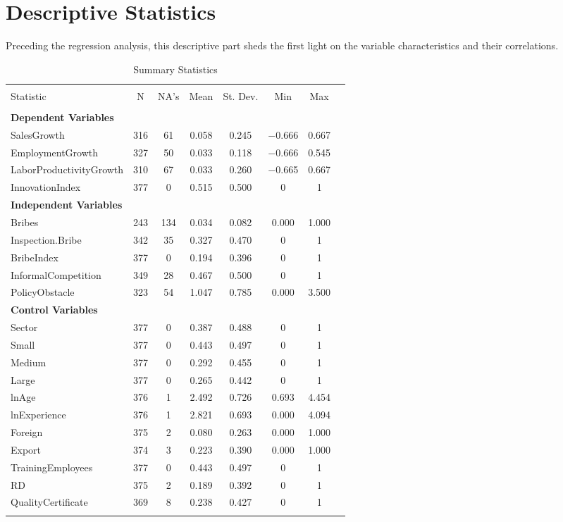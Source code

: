 \section{Descriptive Statistics}
Preceding the regression analysis, this descriptive part sheds the first light on the variable characteristics and their correlations. 
\begin{table}[!htbp] \centering 
  \caption{Summary Statistics} 
  \label{} 
\begin{tabular}{@{\extracolsep{5pt}}lccccccc} 
\\[-1.8ex]\hline 
\hline \\[-1.8ex] 
Statistic & \multicolumn{1}{c}{N} & \multicolumn{1}{c}{NA's} & \multicolumn{1}{c}{Mean} & \multicolumn{1}{c}{St. Dev.} & \multicolumn{1}{c}{Min} &  \multicolumn{1}{c}{Max} \\ 
\hline \\[-1.8ex] 
\textbf{Dependent Variables} \\
SalesGrowth & 316 & 61 & 0.058 & 0.245 & $-$0.666 & 0.667 \\ 
EmploymentGrowth & 327 & 50 & 0.033 & 0.118 & $-$0.666 & 0.545 \\ 
LaborProductivityGrowth & 310 & 67 & 0.033 & 0.260 & $-$0.665 & 0.667 \\ 
InnovationIndex & 377 & 0 & 0.515 & 0.500 & 0 & 1 \\ 
\textbf{Independent Variables} \\
Bribes & 243 & 134 & 0.034 & 0.082 & 0.000 & 1.000 \\ 
Inspection.Bribe & 342 & 35 & 0.327 & 0.470 & 0 & 1 \\ 
BribeIndex & 377 & 0 & 0.194 & 0.396 & 0 & 1 \\ 
InformalCompetition & 349 & 28 & 0.467 & 0.500 & 0 & 1 \\ 
PolicyObstacle & 323 & 54 & 1.047 & 0.785 & 0.000 & 3.500 \\ 
\textbf{Control Variables} \\
Sector & 377 & 0 & 0.387 & 0.488 & 0 & 1 \\ 
Small & 377 & 0 & 0.443 & 0.497 & 0 & 1 \\ 
Medium & 377 & 0 & 0.292 & 0.455 & 0 & 1 \\ 
Large & 377 & 0 & 0.265 & 0.442 & 0 & 1 \\ 
lnAge & 376 & 1 & 2.492 & 0.726 & 0.693 & 4.454 \\ 
lnExperience & 376 & 1 & 2.821 & 0.693 & 0.000 & 4.094 \\ 
Foreign & 375 & 2 & 0.080 & 0.263 & 0.000 & 1.000 \\ 
Export & 374 & 3 & 0.223 & 0.390 & 0.000 & 1.000 \\ 
TrainingEmployees & 377 & 0 & 0.443 & 0.497 & 0 & 1 \\ 
RD & 375 & 2 & 0.189 & 0.392 & 0 & 1 \\ 
QualityCertificate & 369 & 8 & 0.238 & 0.427 & 0 & 1 \\ 
\hline \\[-1.8ex] 
\end{tabular} 
\end{table} 
